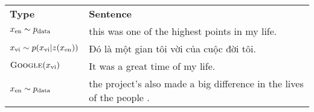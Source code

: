 \begin{table}[h]
\centering
\scriptsize
\begin{tabular}{ l|l }
  \toprule
  \textbf{Type} & \textbf{Sentence} \\
  $x_{\textup{en}} \sim p_{\textup{data}}$ & this was one of the highest points in my life. \\
  $x_{\textup{vi}} \sim p(x_{\textup{vi}}|z(x_{\textup{en}}))$ & \foreignlanguage{vietnamese}{Đó là một gian tôi vời của cuộc đời tôi.} \\
  $\textsc{Google}(x_{\textup{vi}})$ & It was a great time of my life. \\
  \hline
  $x_{\textup{en}} \sim p_{\textup{data}}$ & the project's also made a big difference in the lives of the people . \\

\end{tabular}
\end{table}
